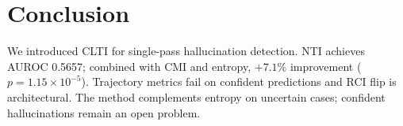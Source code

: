 \section{Conclusion}

We introduced CLTI for single-pass hallucination detection. NTI achieves AUROC 0.5657; combined with CMI and entropy, $+7.1\%$ improvement ($p = 1.15 \times 10^{-5}$). Trajectory metrics fail on confident predictions and RCI flip is architectural. The method complements entropy on uncertain cases; confident hallucinations remain an open problem.
